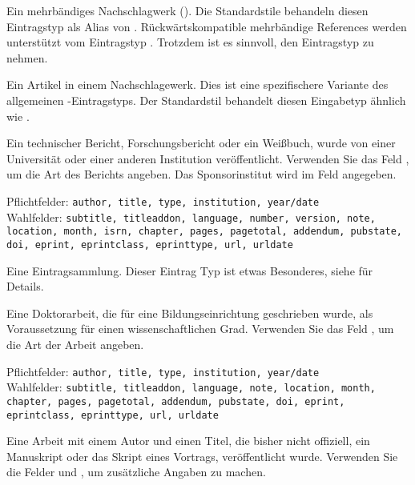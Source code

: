 \documentclass{ltxdockit}[2011/03/25]
\begin{document}
\begin{typelist}

Ein mehrbändiges Nachschlagwerk (). Die Standardstile
behandeln diesen Eintragstyp als Alias von .
Rückwärtskompatible
mehrbändige References werden unterstützt vom Eintragstyp
. Trotzdem ist es sinnvoll, den Eintragstyp
 zu nehmen.



Ein Artikel in einem Nachschlagewerk. Dies ist eine spezifischere Variante des
allgemeinen -Eintragstyps. Der Standardstil behandelt
diesen Eingabetyp ähnlich wie .


Ein technischer Bericht, Forschungsbericht oder ein Weißbuch, wurde von einer
Universität oder einer anderen Institution veröffentlicht. Verwenden Sie das
Feld , um die Art des Berichts angeben. Das Sponsorinstitut wird
im Feld  angegeben. 

Pflichtfelder: \texttt{author, title, type, institution, year/date}\\
Wahlfelder: \texttt{subtitle,
titleaddon, language, number, version, note, loca\-tion, month, isrn, chapter,
pages, pagetotal, addendum, pubstate, doi, eprint, eprintclass, eprinttype, url,
urldate}


Eine Eintragsammlung. Dieser Eintrag Typ ist etwas Besonderes, siehe
 für Details. 


Eine Doktorarbeit, die für eine Bildungseinrichtung geschrieben wurde, als
Voraussetzung für einen wissenschaftlichen Grad. Verwenden Sie das Feld
, um die Art der Arbeit angeben. 

Pflichtfelder: \texttt{author, title, type, institution, year/date}\\
Wahlfelder: \texttt{subtitle,
titleaddon, language, note, location, month, chapter, pages, pagetotal,
addendum, pubstate, doi, eprint, eprintclass, eprint\-type, url, urldate}


Eine Arbeit mit einem Autor und einen Titel, die bisher nicht offiziell, ein
Manuskript oder das Skript eines Vortrags, veröffentlicht wurde. Verwenden Sie
die Felder  und , um zusätzliche Angaben
zu machen. 


\end{typelist}
\end{document}
